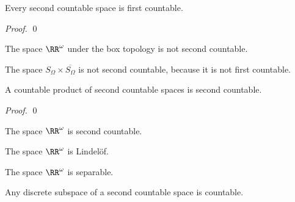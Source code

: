 \begin{proposition}
    Every second countable space is first countable.
\end{proposition}

\begin{proof}
    \pf
    \qed
\end{proof}

\begin{corollary}
    The space $\RR^\omega$ under the box topology is not second countable.
\end{corollary}

\begin{example}
    The space $S_\Omega \times \overline{S_\Omega}$ is not second countable, because it is not first countable.
\end{example}

\begin{proposition}[AC]
    A countable product of second countable spaces is second countable.
\end{proposition}

\begin{proof}
    \pf
    \qed
\end{proof}

\begin{corollary}
    The space $\RR^\omega$ is second countable.
\end{corollary}

\begin{corollary}
    The space $\RR^\omega$ is Lindel\"{o}f.
\end{corollary}

\begin{corollary}
    The space $\RR^\omega$ is separable.
\end{corollary}

\begin{proposition}[AC]
    Any discrete subspace of a second countable space is countable.
\end{proposition}


